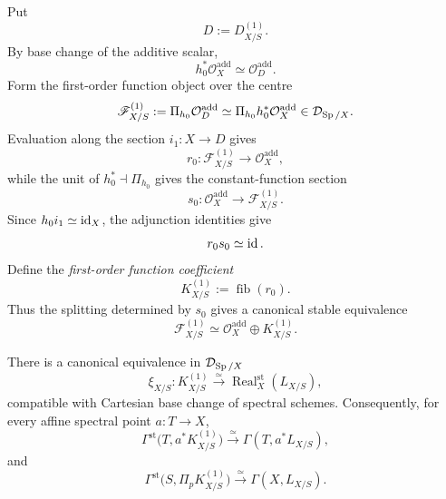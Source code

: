 \begin{construction}
\label{con:stable-cotangent-coefficient}
Put
\[
  D:=D^{(1)}_{X/S}.
\]
By base change of the additive scalar,
\[
  h_0^*\mathcal O_X^{\mathrm{add}}
  \simeq
  \mathcal O_D^{\mathrm{add}}.
\]
Form the first-order function object over the centre
\[
  \mathscr F^{(1)}_{X/S}
  :=
  \Pi_{h_0}\mathcal O_D^{\mathrm{add}}
  \simeq
  \Pi_{h_0}h_0^*\mathcal O_X^{\mathrm{add}}
  \in\mathcal D_{\operatorname{Sp}/X}.
\]
Evaluation along the section \(i_1:X\to D\) gives
\[
  r_0:
  \mathscr F^{(1)}_{X/S}
  \longrightarrow
  \mathcal O_X^{\mathrm{add}},
\]
while the unit of \(h_0^*\dashv\Pi_{h_0}\) gives the constant-function section
\[
  s_0:
  \mathcal O_X^{\mathrm{add}}
  \longrightarrow
  \mathscr F^{(1)}_{X/S}.
\]
Since \(h_0i_1\simeq\operatorname{id}_X\), the adjunction identities give
\[
  r_0s_0\simeq\operatorname{id}.
\]
Define the \emph{first-order function coefficient}
\[
  K^{(1)}_{X/S}
  :=
  \operatorname{fib}(r_0).
\]
Thus the splitting determined by \(s_0\) gives a canonical stable equivalence
\[
  \mathscr F^{(1)}_{X/S}
  \simeq
  \mathcal O_X^{\mathrm{add}}
  \oplus
  K^{(1)}_{X/S}.
\]
\end{construction}

\begin{proposition}
\label{prop:stable-cotangent-realization}
There is a canonical equivalence in \(\mathcal D_{\operatorname{Sp}/X}\)
\[
  \xi_{X/S}:
  K^{(1)}_{X/S}
  \xrightarrow{\simeq}
  \operatorname{Real}^{\mathrm{st}}_X(L_{X/S}),
\]
compatible with Cartesian base change of spectral schemes. Consequently, for every affine spectral point \(a:T\to X\),
\[
  \Gamma^{\mathrm{st}}
  \bigl(T,a^*K^{(1)}_{X/S}\bigr)
  \xrightarrow{\simeq}
  \Gamma(T,a^*L_{X/S}),
\]
and
\[
  \Gamma^{\mathrm{st}}
  \bigl(S,\Pi_pK^{(1)}_{X/S}\bigr)
  \xrightarrow{\simeq}
  \Gamma(X,L_{X/S}).
\]
\end{proposition}

